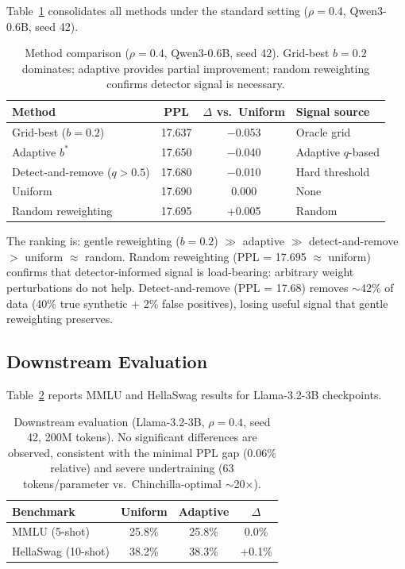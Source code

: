 \documentclass[11pt]{article}
\begin{document}
Table~\ref{tab:baselines} consolidates all methods under the standard setting ($\rho = 0.4$, Qwen3-0.6B, seed 42).

\begin{table}[t]
\centering
\caption{Method comparison ($\rho = 0.4$, Qwen3-0.6B, seed 42). Grid-best $b = 0.2$ dominates; adaptive provides partial improvement; random reweighting confirms detector signal is necessary.}
\label{tab:baselines}
\small
\begin{tabular}{lccl}
\toprule
Method & PPL & $\Delta$ vs.\ Uniform & Signal source \\
\midrule
Grid-best ($b = 0.2$) & 17.637 & $-$0.053 & Oracle grid \\
Adaptive $b^*$ & 17.650 & $-$0.040 & Adaptive $q$-based \\
Detect-and-remove ($q > 0.5$) & 17.680 & $-$0.010 & Hard threshold \\
Uniform & 17.690 & 0.000 & None \\
Random reweighting & 17.695 & +0.005 & Random \\
\bottomrule
\end{tabular}
\end{table}

The ranking is: gentle reweighting ($b = 0.2$) $\gg$ adaptive $\gg$ detect-and-remove $>$ uniform $\approx$ random.
Random reweighting (PPL = 17.695 $\approx$ uniform) confirms that detector-informed signal is load-bearing: arbitrary weight perturbations do not help.
Detect-and-remove (PPL = 17.68) removes $\sim$42\% of data (40\% true synthetic + 2\% false positives), losing useful signal that gentle reweighting preserves.

\subsection{Downstream Evaluation}
\label{sec:downstream}

Table~\ref{tab:downstream} reports MMLU and HellaSwag results for Llama-3.2-3B checkpoints.

\begin{table}[t]
\centering
\caption{Downstream evaluation (Llama-3.2-3B, $\rho = 0.4$, seed 42, 200M tokens). No significant differences are observed, consistent with the minimal PPL gap (0.06\% relative) and severe undertraining (63 tokens/parameter vs.\ Chinchilla-optimal $\sim$20$\times$).}
\label{tab:downstream}
\small
\begin{tabular}{lccc}
\toprule
Benchmark & Uniform & Adaptive & $\Delta$ \\
\midrule
MMLU (5-shot) & 25.8\% & 25.8\% & 0.0\% \\
HellaSwag (10-shot) & 38.2\% & 38.3\% & +0.1\% \\
\bottomrule
\end{tabular}
\end{table}
\end{document}
